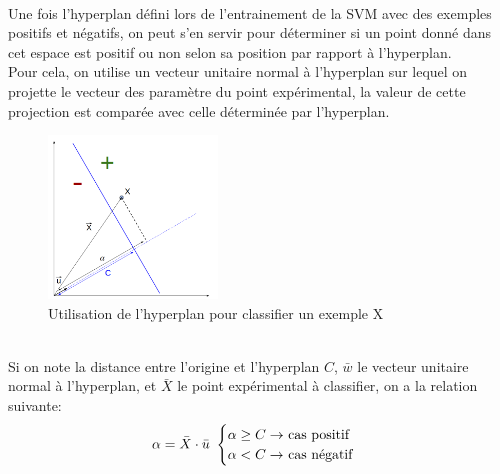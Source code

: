 \documentclass[12pt]{article}
\begin{document}
\\
Une fois l'hyperplan défini lors de l'entrainement de la SVM avec des exemples positifs et négatifs, on peut s'en servir pour déterminer si un point donné dans cet espace est positif ou non selon sa position par rapport à l'hyperplan.\\
Pour cela, on utilise un vecteur unitaire normal à l'hyperplan sur lequel on projette le vecteur des paramètre du point expérimental, la valeur de cette projection est comparée avec celle déterminée par l'hyperplan.
\begin{figure}[!ht]
    \centering
	    \includegraphics[width=0.4\textwidth]{img/projection.png}
	    \caption{Utilisation de l'hyperplan pour classifier un exemple X}
        \label{fig:projection}
\end{figure}
\\
Si on note la distance entre l'origine et l'hyperplan $C$, $\bar{w}$ le vecteur unitaire normal à l'hyperplan, et $\bar{X}$ le point expérimental à classifier, on a la relation suivante:
\[\alpha=\bar{X}\cdot\bar{u}~
\begin{cases}
\alpha\geq C\rightarrow~$cas positif$\\
\alpha<C\rightarrow~$cas négatif$
\end{cases}
\]
\end{document}
